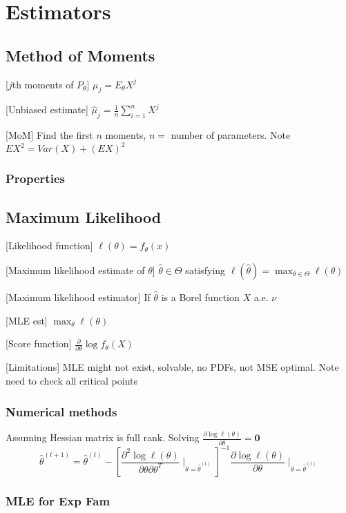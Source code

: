 \section{Estimators}

\subsection{Method of Moments}
[$j$th moments of $P_\theta$] $\mu_j = E_\theta X^j$

[Unbiased estimate] $\hat\mu_j = \frac{1}{n}\sum_{i=1}^n X^j$

[MoM] Find the first $n$ moments, $n=$ number of parameters. Note $EX^2=Var(X)+(EX)^2$

\subsubsection{Properties}

\subsection{Maximum Likelihood}

[Likelihood function] $\ell(\theta)=f_{\theta}(x)$

[Maximum likelihood estimate of $\theta$] $\hat\theta \in \Theta$ satisfying $\ell(\hat\theta)=\max_{\theta\in\Theta}\ell(\theta)$

[Maximum likelihood estimator] If $\hat\theta$ is a Borel function $X$ a.e. $\nu$

[MLE est] $\max_{\theta}\ell(\theta)$

[Score function] $\frac{\partial}{\partial\theta}\log f_\theta(X)$

[Limitations] MLE might not exist, solvable, no PDFs, not MSE optimal. Note need to check all critical points

\subsubsection{Numerical methods}

Assuming Hessian matrix is full rank. Solving $\frac{\partial\log\ell(\theta)}{\partial\theta}=\mathbf{0}$
$$
\hat{\theta}^{(t+1)} = \hat{\theta}^{(t)} - \left[ 
    \frac{\partial^2 \log \ell(\theta)}{\partial\theta\partial\theta^T} \mid_{\theta=\hat{\theta}^{(t)}}
\right]^{-1}
    \frac{\partial \log \ell(\theta)}{\partial\theta} \mid_{\theta=\hat{\theta}^{(t)}}
$$

\subsubsection{MLE for Exp Fam}

